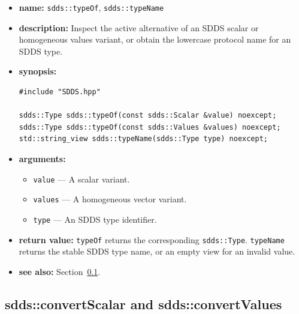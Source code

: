 \documentclass[11pt]{article}
\begin{document}
\begin{itemize}
\item {\bf name:}\newline
{\tt sdds::typeOf}, {\tt sdds::typeName}
\item {\bf description:}\newline
Inspect the active alternative of an SDDS scalar or homogeneous values variant,
or obtain the lowercase protocol name for an SDDS type.
\item {\bf synopsis:}
\begin{verbatim}
#include "SDDS.hpp"

sdds::Type sdds::typeOf(const sdds::Scalar &value) noexcept;
sdds::Type sdds::typeOf(const sdds::Values &values) noexcept;
std::string_view sdds::typeName(sdds::Type type) noexcept;
\end{verbatim}
\item {\bf arguments:}
\begin{itemize}
\item {\tt value} --- A scalar variant.
\item {\tt values} --- A homogeneous vector variant.
\item {\tt type} --- An SDDS type identifier.
\end{itemize}
\item {\bf return value:}\newline
{\tt typeOf} returns the corresponding {\tt sdds::Type}.  {\tt typeName}
returns the stable SDDS type name, or an empty view for an invalid value.
\item {\bf see also:}\newline
Section~\ref{CppConversions}.
\end{itemize}

\subsection{sdds::convertScalar and sdds::convertValues}
\label{CppConversions}
\end{document}
